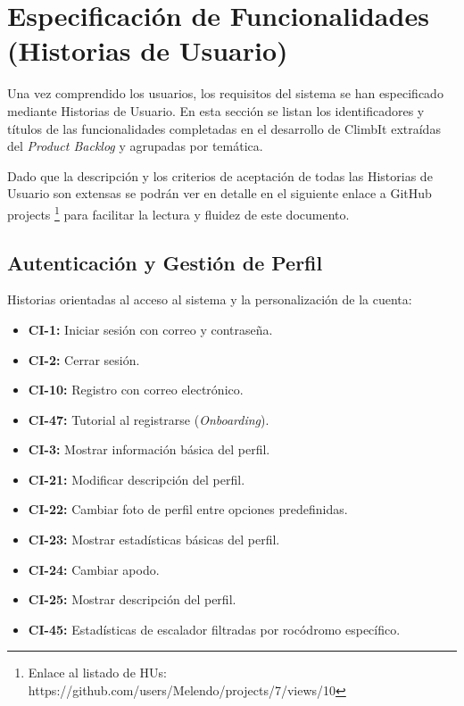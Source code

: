 \section{Especificación de Funcionalidades (Historias de Usuario)}

Una vez comprendido los usuarios, los requisitos del sistema se han especificado mediante Historias de Usuario. En esta sección se listan los identificadores y títulos de las funcionalidades completadas en el desarrollo de ClimbIt extraídas del \textit{Product Backlog} y agrupadas por temática. 

Dado que la descripción y los criterios de aceptación de todas las Historias de Usuario son extensas se podrán ver en detalle en el siguiente enlace a GitHub projects \footnote{Enlace al listado de HUs: https://github.com/users/Melendo/projects/7/views/10} para facilitar la lectura y fluidez de este documento.

\subsection{Autenticación y Gestión de Perfil}
Historias orientadas al acceso al sistema y la personalización de la cuenta:
\begin{itemize}
    \item \textbf{CI-1:} Iniciar sesión con correo y contraseña.
    \item \textbf{CI-2:} Cerrar sesión.
    \item \textbf{CI-10:} Registro con correo electrónico.
    \item \textbf{CI-47:} Tutorial al registrarse (\textit{Onboarding}).
    \item \textbf{CI-3:} Mostrar información básica del perfil.
    \item \textbf{CI-21:} Modificar descripción del perfil.
    \item \textbf{CI-22:} Cambiar foto de perfil entre opciones predefinidas.
    \item \textbf{CI-23:} Mostrar estadísticas básicas del perfil.
    \item \textbf{CI-24:} Cambiar apodo.
    \item \textbf{CI-25:} Mostrar descripción del perfil.
    \item \textbf{CI-45:} Estadísticas de escalador filtradas por rocódromo específico.
\end{itemize}

